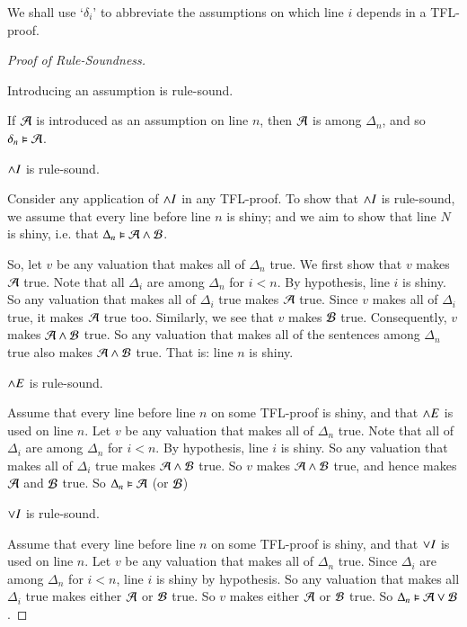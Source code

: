 \documentclass[12pt, a4paper, oneside, openright, titlepage]{book}
\begin{document}
\begin{rmk}
    We shall use `$\delta_i$' to abbreviate the assumptions on which line $i$ depends in a TFL-proof.
\end{rmk}

\begin{proof}[Proof of Rule-Soundness]
    \begin{claim}[1]
        Introducing an assumption is rule-sound.
    \end{claim}
    If $\mathcal{A}$ is introduced as an assumption on line $n$, then $\mathcal{A}$ is among $\Delta_n$, and so $\delta_n \vDash \mathcal{A}$.

    \begin{claim}[2]
        $\wedge I$ is rule-sound.
    \end{claim}
    Consider any application of $\wedge I$ in any TFL-proof. To show that $\wedge I$ is rule-sound, we assume that every line before line $n$ is shiny; and we aim to show that line $N$ is shiny, i.e. that $\Delta_n \vDash \mathcal{A}\wedge \mathcal{B}$.

    So, let $v$ be any valuation that makes all of $\Delta_n$ true. We first show that $v$ makes $\mathcal{A}$ true. Note that all $\Delta_i$ are among $\Delta_n$ for $i< n$. By hypothesis, line $i$ is shiny. So any valuation that makes all of $\Delta_i$ true makes $\mathcal{A}$ true. Since $v$ makes all of $\Delta_i$ true, it makes $\mathcal{A}$ true too. Similarly, we see that $v$ makes $\mathcal{B}$ true. Consequently, $v$ makes $\mathcal{A} \wedge\mathcal{B}$ true. So any valuation that makes all of the sentences among $\Delta_n$ true also makes $\mathcal{A}\wedge\mathcal{B}$ true. That is: line $n$ is shiny.


    \begin{claim}[3]
        $\wedge E$ is rule-sound.
    \end{claim}
    Assume that every line before line $n$ on some TFL-proof is shiny, and that $\wedge E$ is used on line $n$. Let $v$ be any valuation that makes all of $\Delta_n$ true. Note that all of $\Delta_i$ are among $\Delta_n$ for $i < n$. By hypothesis, line $i$ is shiny. So any valuation that makes all of $\Delta_i$ true makes $\mathcal{A}\wedge\mathcal{B}$ true. So $v$ makes $\mathcal{A}\wedge \mathcal{B}$ true, and hence makes $\mathcal{A}$ and $\mathcal{B}$ true. So $\Delta_n\vDash \mathcal{A}$ (or $\mathcal{B}$)

    \begin{claim}[4]
        $\vee I$ is rule-sound.
    \end{claim}
    Assume that every line before line $n$ on some TFL-proof is shiny, and that $\vee I$ is used on line $n$. Let $v$ be any valuation that makes all of $\Delta_n$ true. Since $\Delta_i$ are among $\Delta_n$ for $i < n$, line $i$ is shiny by hypothesis. So any valuation that makes all $\Delta_i$ true makes either $\mathcal{A}$ or $\mathcal{B}$ true. So $v$ makes either $\mathcal{A}$ or $\mathcal{B}$ true. So $\Delta_n\vDash \mathcal{A}\vee\mathcal{B}$.
    


\end{proof}
\end{document}
